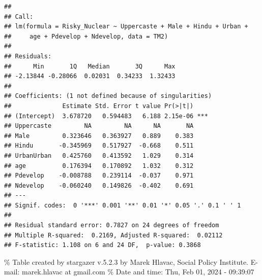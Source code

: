 \documentclass[
]{article}
\begin{document}
\begin{verbatim}
## 
## Call:
## lm(formula = Risky_Nuclear ~ Uppercaste + Male + Hindu + Urban + 
##     age + Pdevelop + Ndevelop, data = TM2)
## 
## Residuals:
##      Min       1Q   Median       3Q      Max 
## -2.13844 -0.28066  0.02031  0.34233  1.32433 
## 
## Coefficients: (1 not defined because of singularities)
##              Estimate Std. Error t value Pr(>|t|)    
## (Intercept)  3.678720   0.594483   6.188 2.15e-06 ***
## Uppercaste         NA         NA      NA       NA    
## Male         0.323646   0.363927   0.889    0.383    
## Hindu       -0.345969   0.517927  -0.668    0.511    
## UrbanUrban   0.425760   0.413592   1.029    0.314    
## age          0.176394   0.170892   1.032    0.312    
## Pdevelop    -0.008788   0.239114  -0.037    0.971    
## Ndevelop    -0.060240   0.149826  -0.402    0.691    
## ---
## Signif. codes:  0 '***' 0.001 '**' 0.01 '*' 0.05 '.' 0.1 ' ' 1
## 
## Residual standard error: 0.7827 on 24 degrees of freedom
## Multiple R-squared:  0.2169, Adjusted R-squared:  0.02112 
## F-statistic: 1.108 on 6 and 24 DF,  p-value: 0.3868
\end{verbatim}

\begingroup\setlength{\tabcolsep}{1pt}

\renewcommand{\arraystretch}{0.7}

\% Table created by stargazer v.5.2.3 by Marek Hlavac, Social Policy
Institute. E-mail: marek.hlavac at gmail.com \% Date and time: Thu, Feb
01, 2024 - 09:39:07
\end{document}
